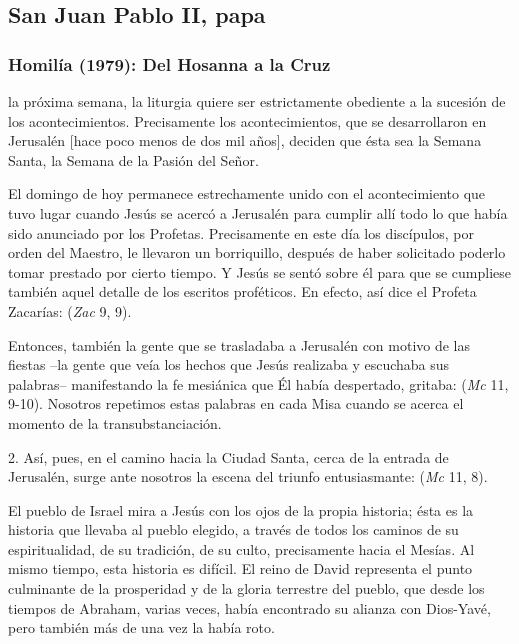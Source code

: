 \newsection
\subsection{San Juan Pablo II, papa}

\subsubsection{Homilía (1979): Del Hosanna a la Cruz}


\begin{body}
 la próxima semana, la liturgia quiere ser estrictamente obediente a la sucesión de los acontecimientos. Precisamente los acontecimientos, que se desarrollaron en Jerusalén [hace poco menos de dos mil años], deciden que ésta sea la Semana Santa, la Semana de la Pasión del Señor.

El domingo de hoy permanece estrechamente unido con el acontecimiento que tuvo lugar cuando Jesús se acercó a Jerusalén para cumplir allí todo lo que había sido anunciado por los Profetas. Precisamente en este día los discípulos, por orden del Maestro, le llevaron un borriquillo, después de haber solicitado poderlo tomar prestado por cierto tiempo. Y Jesús se sentó sobre él para que se cumpliese también aquel detalle de los escritos proféticos. En efecto, así dice el Profeta Zacarías:  (\textit{Zac }9, 9).

Entonces, también la gente que se trasladaba a Jerusalén con motivo de las fiestas –la gente que veía los hechos que Jesús realizaba y escuchaba sus palabras– manifestando la fe mesiánica que Él había despertado, gritaba:  (\textit{Mc} 11, 9-10). Nosotros repetimos estas palabras en cada Misa cuando se acerca el momento de la transubstanciación.

2. Así, pues, en el camino hacia la Ciudad Santa, cerca de la entrada de Jerusalén, surge ante nosotros la escena del triunfo entusiasmante:  (\textit{Mc} 11, 8).

El pueblo de Israel mira a Jesús con los ojos de la propia historia; ésta es la historia que llevaba al pueblo elegido, a través de todos los caminos de su espiritualidad, de su tradición, de su culto, precisamente hacia el Mesías. Al mismo tiempo, esta historia es difícil. El reino de David representa el punto culminante de la prosperidad y de la gloria terrestre del pueblo, que desde los tiempos de Abraham, varias veces, había encontrado su alianza con Dios-Yavé, pero también más de una vez la había roto.


\end{body}
